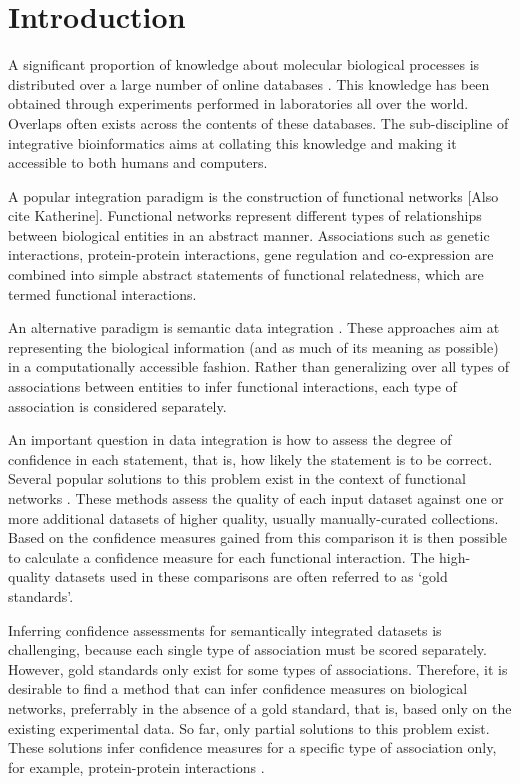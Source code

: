\documentclass{bioinfo}
\newcommand{\note}[1]{{\color{red}[#1]}}
\begin{document}
\section{Introduction} 

A significant proportion of knowledge about molecular biological processes is distributed over a large number of online databases \citep{stein_creating_2002}. This knowledge has been obtained through experiments performed in laboratories all over the world. Overlaps often exists across the contents of these databases. The sub-discipline of integrative bioinformatics aims at collating this knowledge and making it accessible to both humans and computers. 

A popular integration paradigm is the construction of functional networks \citep{von_mering_string:_2003,warde-farley_genemania_2010}\note{Also cite Katherine}. Functional networks represent different types of relationships between biological entities in an abstract manner. Associations such as genetic interactions, protein-protein interactions, gene regulation and co-expression are combined into simple abstract statements of functional relatedness, which are termed functional interactions.

An alternative paradigm is semantic data integration \citep{cheung_yeasthub:_2005,smith_obo_2007,koehler_graph-based_2006}. These approaches aim at representing the biological information (and as much of its meaning as possible) in a computationally accessible fashion. Rather than generalizing over all types of associations between entities to infer functional interactions, each type of association is considered separately.

An important question in data integration is how to assess the degree of confidence in each statement, that is, how likely the statement is to be correct. Several popular solutions to this problem exist in the context of functional networks \citep{lee_probabilistic_2004,troyanskaya_bayesian_2003}.
These methods assess the quality of each input dataset against one or more additional datasets of higher quality, usually manually-curated collections. Based on the confidence measures gained from this comparison it is then possible to calculate a confidence measure for each functional interaction. The high-quality datasets used in these comparisons are often referred to as `gold standards'. 

Inferring confidence assessments for semantically integrated datasets is challenging, because each single type of association must be scored separately. However, gold standards only exist for some types of associations. Therefore, it is desirable to find a method that can infer confidence measures on biological networks, preferrably in the absence of a gold standard, that is, based only on the existing experimental data. So far, only partial solutions to this problem exist. These solutions infer confidence measures for a specific type of association only, for example, protein-protein interactions \citep{bader_gaining_2004,braun_experimentally_2009,venkatesan_empirical_2009}.
\end{document}
